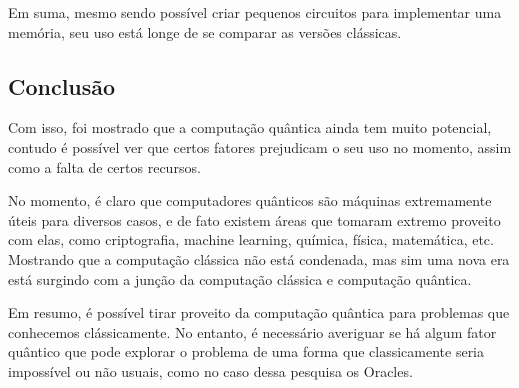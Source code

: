 \documentclass{article}
\begin{document}
Em suma, mesmo sendo possível criar pequenos circuitos para implementar uma memória, seu uso está longe de se comparar as versões clássicas.

\subsection{Conclusão}

Com isso, foi mostrado que a computação quântica ainda tem muito potencial, contudo é possível ver que certos fatores prejudicam o seu uso no momento, assim como a falta de certos recursos.

No momento, é claro que computadores quânticos são máquinas extremamente úteis para diversos casos, e de fato existem áreas que tomaram extremo proveito com elas, como criptografia, machine learning, química, física, matemática, etc. Mostrando que a computação clássica não está condenada, mas sim uma nova era está surgindo com a junção da computação clássica e computação quântica.

Em resumo, é possível tirar proveito da computação quântica para problemas que conhecemos clássicamente. No entanto, é necessário averiguar se há algum fator quântico que pode explorar o problema de uma forma que classicamente seria impossível ou não usuais, como no caso dessa pesquisa os Oracles.




\nocite{SOARE2009368}
\nocite{odonnell_2015_lecture}
\nocite{bacon_2006_cse}
\nocite{lipics_stacs}
\nocite{odonnell_2015_lecture_2}
\nocite{brodkorb_2019_the}
\nocite{amreen_oracle}
\nocite{kalyanasyndaram_2021_mod04lec23}
\nocite{davis_2006_turing}
\nocite{viswanathan_2013_reductions}
\nocite{Fan_2007}
\nocite{cryptoeprint:2020/1270}
\nocite{buhrman1998quantum}
\nocite{sanchezrivero2023initial}
\nocite{gilliam2020canonical}
\nocite{Kashefi_2002}
\nocite{e21080800}
\nocite{Zeng_2014}
\nocite{atici2004comparative}
\nocite{sundarappan_2022_how}
\nocite{dai_view}
\nocite{sep-game-theory}
\nocite{Giovannetti_2008}
\nocite{jaques2023qram}
\nocite{PythonEWL2022}
\nocite{frackiewicz2011application}
\nocite{Eisert_1999}
\nocite{usman_2019_kilometres}
\nocite{ldiaandr_2021_tower}
\nocite{diptokarmakar47_2019_how}
\nocite{a2020_towers}
\nocite{geeksforgeeks_2014_program}
\nocite{khan_2021_quantum}
\nocite{legn_2022_dilemma}
\nocite{siegelwax_2022_quantum}
\nocite{landi_density}
\nocite{bacon_2006_cse}
\nocite{vijayakrishnan_2019_role}
\nocite{python_scientific}
\nocite{scipyoptimizeminimize_scalar}
\nocite{davis_optimization}
\nocite{scipyoptimizeminimize}





\end{document}
